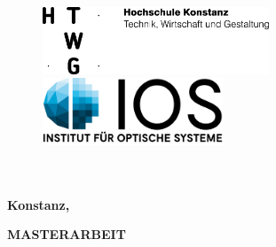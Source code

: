 \begin{titlepage}

\vspace*{-2.5cm}

\begin{figure}[h]
\hspace*{-2cm}
\includegraphics[height=2cm]{title/HTWG-Logo_de_300dpi.png}
\hspace*{4cm}\includegraphics[height=2cm,]{title/IOS_Logo2016_lettering_de.png}


\end{figure}

\vspace{2cm}

\begin{center}
	 \LARGE{
		\textbf{\thema} \\[5cm]
	}
	\Large{
		\textbf{\autor}} \\[5.5cm]
	\large{
		\textbf{Konstanz, \abgabedatum} \\[2.3cm]
	}
	
	\Huge{
		\textbf{{\sf MASTERARBEIT}}
	}
\end{center}

\end{titlepage}

